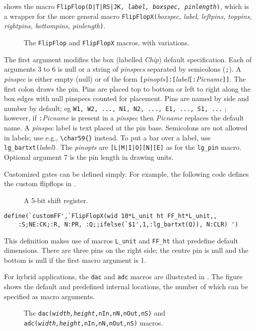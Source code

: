  shows
the macro {\tt FlipFlop(D|T|RS|JK, {\sl label, boxspec, pinlength})},
which is a
wrapper for the more general macro {\tt FlipFlopX(}{\sl boxspec, label,
leftpins, toppins, rightpins, bottompins, pinlength}{\tt )}.
\begin{figure}[h!t]
   
   \caption{The {\tt FlipFlop} and {\tt FlipFlopX} macros, with variations.}
   \label{FlipFlops}
   \end{figure}
The first argument modifies the box (labelled {\sl Chip}) default specification.
Each of arguments 3 to 6 is null or a string of {\sl pinspecs} separated
by semicolons ({\tt;}).
A {\sl pinspec} is either empty (null) or of the form
{\tt[}{\sl pinopts}{\tt]:[}{\sl label}{\tt[:}{\sl Picname}{\tt]]}.
The first colon draws the pin.
Pins are placed top to bottom or left to right along the box edges with
null pinspecs counted for placement. Pins are named by side and number
by default; eg {\tt W1, W2, ..., N1, N2, ..., E1, ..., S1, ...} ; however,
if {\tt:}{\sl Picname} is present in a {\sl pinspec} then {\sl Picname}
replaces the default name. A {\sl pinspec} label is text placed at the pin
base. Semicolons are
not allowed in labels; use e.g., \verb|\char59{}| instead. To put a bar over
a label, use {\tt lg\_bartxt(}{\sl label}{\tt)}.
The {\sl pinopts} are {\tt [L|M|I|O][N][E]} as for the \verb|lg_pin| macro.
Optional argument 7 is the pin length in drawing units.

Customized gates can be defined simply.
For example, the following code defines the custom flipflops in .
\begin{figure}[h!t]
   
   \caption{A 5-bit shift register.}
   \label{ShiftR}
   \end{figure}
\begin{verbatim}
define(`customFF',`FlipFlopX(wid 10*L_unit ht FF_ht*L_unit,,
    :S;NE:CK;:R, N:PR, :Q;;ifelse(`$1',1,:lg_bartxt(Q)), N:CLR) ')
\end{verbatim}
This definition makes use of macros \verb|L_unit| and
\verb|FF_ht| that predefine default dimensions.
There are three pins on the right side; the centre pin is null and
the bottom is null if the first macro argument is 1.

For hybrid applications, the \verb|dac| and \verb|adc| macros are
illustrated in .
The figure shows the default and predefined internal locations, the number
of which can be specified as macro arguments.
\begin{figure}[h!t]
   
   \caption{The {\tt dac({\sl width,height},nIn,nN,nOut,nS)}
   and {\tt adc({\sl width,height},nIn,nN,nOut,nS)} macros.}
   \label{Dac}
   \end{figure}

